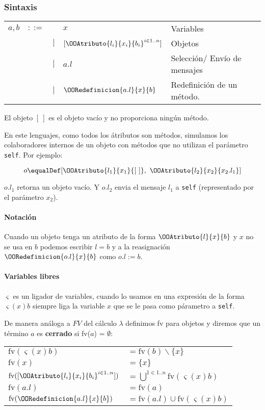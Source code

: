 \subsubsection{Sintaxis}
\begin{tabular}{lllll}
	$a,b$ &$::=$& &$x$ & Variables \\
 	      &     & $|$ &$[\OOAtributo{l_i}{x_i}{b_i}^{i\in1..n}]$ &  Objetos\\
 	      &     & $|$ &$a.l$ &  Selección/ Envío de mensajes \\
 	      &     & $|$ &$\OORedefinicion{a.l}{x}{b}$ &  Redefinición de un método.	       	       	      
\end{tabular}

\vspace*{5mm}
El objeto $[~]$ es el objeto vacío y no proporciona ningún método.

En este lenguajes, como todos los átributos son métodos, simulamos los colaboradores internos de un objeto con métodos que no utilizan el parámetro \texttt{self}. Por ejemplo:

$$o \equalDef [\OOAtributo{l_1}{x_1}{[~]},~
				\OOAtributo{l_2}{x_2}{x_2.l_1}]$$

$o.l_1$ retorna un objeto vacío. Y $o.l_2$ envia el mensaje $l_1$ a \texttt{self} (representado por el parámetro $x_2$). 

\paragraph{Notación} Cuando un objeto tenga un atributo de la forma $\OOAtributo{l}{x}{b}$ y $x$ no se usa en $b$ podemos escribir $l = b$ y a la reasignación $\OORedefinicion{o.l}{x}{b}$ como $o.l := b$.

\paragraph{Variables libres}
$\varsigma$ es un ligador de variables, cuando lo usamos en una expresión de la forma $\varsigma(x)b$ siempre liga la variable $x$ que se le pasa como párametro a \texttt{self}.

De manera análoga a $FV$ del cálculo $\lambda$ definimos fv para objetos y diremos que un término $a$ es \textbf{cerrado} si fv($a$) = $\emptyset$:

\begin{center}
\begin{tabular}{ll}
	$\text{fv}(\varsigma(x)b)$ &$= \text{fv}(b)\backslash \{x\} $\\
	$\text{fv}(x)$ &$= \{x\} $\\
	$\text{fv}([\OOAtributo{l_i}{x_i}{b_i}^{i\in 1..n}])$ &$=  \bigcup^{1\in 1..n} \text{fv}(\varsigma(x)b)$\\
	$\text{fv}(a.l)$ &$= \text{fv}(a) $\\
	$\text{fv}(\OORedefinicion{a.l}{x}{b})$ &$= \text{fv}(a.l)\cup \text{fv}(\varsigma(x)b) $\\
\end{tabular}
\end{center}
